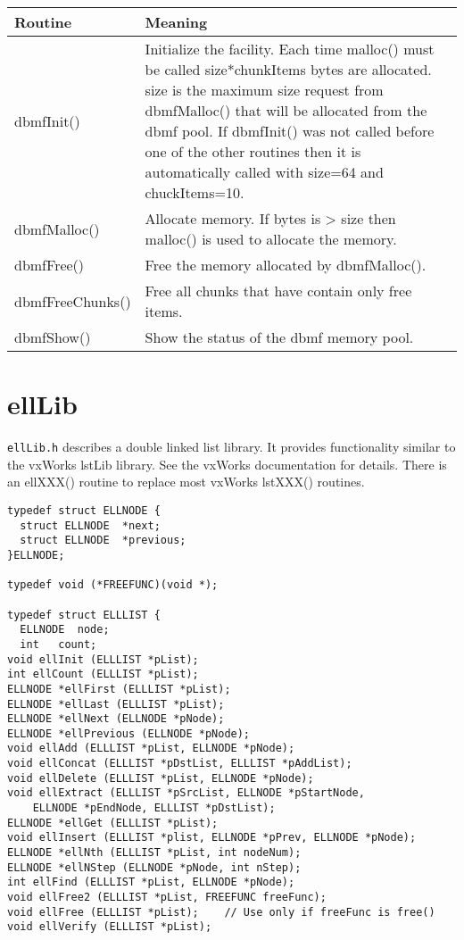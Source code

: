 \begin{center}
\begin{longtable}{p{1.3in}p{5.5in}}
\textbf{Routine} & \textbf{Meaning}\\
\hline
dbmfInit() & Initialize the facility. Each time malloc() must be called size*chunkItems bytes are allocated. size is the maximum size request from dbmfMalloc() that will be allocated from the dbmf pool. If dbmfInit() was not called before one of the other routines then it is automatically called with size=64 and chuckItems=10.\\
dbmfMalloc() & Allocate memory. If bytes is \textgreater{} size then malloc() is used to allocate the memory.\\
dbmfFree() & Free the memory allocated by dbmfMalloc().\\
dbmfFreeChunks() & Free all chunks that have contain only free items.\\
dbmfShow() & Show the status of the dbmf memory pool.
\end{longtable}

\end{center}


\section{ellLib}

\verb|ellLib.h| describes a double linked list library. It provides functionality similar to the vxWorks lstLib library. See the 
vxWorks documentation for details. There is an ellXXX() routine to replace most vxWorks lstXXX() routines.

\begin{verbatim}
typedef struct ELLNODE {
  struct ELLNODE  *next;
  struct ELLNODE  *previous;
}ELLNODE;

typedef void (*FREEFUNC)(void *);

typedef struct ELLLIST {
  ELLNODE  node;
  int   count;
void ellInit (ELLLIST *pList);
int ellCount (ELLLIST *pList);
ELLNODE *ellFirst (ELLLIST *pList);
ELLNODE *ellLast (ELLLIST *pList);
ELLNODE *ellNext (ELLNODE *pNode);
ELLNODE *ellPrevious (ELLNODE *pNode);
void ellAdd (ELLLIST *pList, ELLNODE *pNode);
void ellConcat (ELLLIST *pDstList, ELLLIST *pAddList);
void ellDelete (ELLLIST *pList, ELLNODE *pNode);
void ellExtract (ELLLIST *pSrcList, ELLNODE *pStartNode,
    ELLNODE *pEndNode, ELLLIST *pDstList);
ELLNODE *ellGet (ELLLIST *pList);
void ellInsert (ELLLIST *plist, ELLNODE *pPrev, ELLNODE *pNode);
ELLNODE *ellNth (ELLLIST *pList, int nodeNum);
ELLNODE *ellNStep (ELLNODE *pNode, int nStep);
int ellFind (ELLLIST *pList, ELLNODE *pNode);
void ellFree2 (ELLLIST *pList, FREEFUNC freeFunc);
void ellFree (ELLLIST *pList);    // Use only if freeFunc is free()
void ellVerify (ELLLIST *pList);
\end{verbatim}

